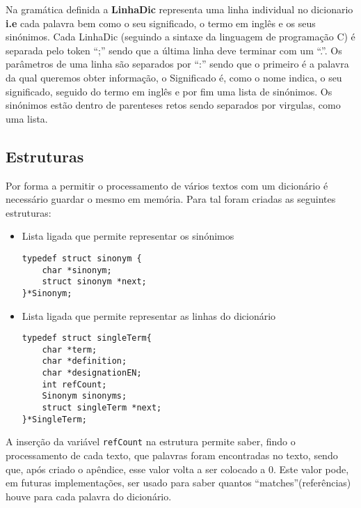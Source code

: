 \documentclass{llncs}
\begin{document}
Na gramática definida a \textbf{LinhaDic} representa uma linha individual no dicionario \textbf{i.e} cada palavra bem como o seu significado, o termo em inglês e os seus sinónimos. Cada LinhaDic (seguindo a sintaxe da linguagem de programação C) é separada pelo token ``;'' sendo que a última linha deve terminar com um ``.''. Os parâmetros de uma linha são separados por ``:'' sendo que o primeiro é a palavra da qual queremos obter informação, o Significado é, como o nome indica, o seu significado, seguido do termo em inglês e por fim uma lista de sinónimos. Os sinónimos estão dentro de parenteses retos sendo separados por virgulas, como uma lista.

\subsection{Estruturas}
Por forma a permitir o processamento de vários textos com um dicionário é necessário guardar o mesmo em memória. Para tal foram criadas as seguintes estruturas:
\renewcommand{\labelitemi}{$\bullet$}
\begin{itemize}
\item Lista ligada que permite representar os sinónimos
\begin{lstlisting}
typedef struct sinonym {
    char *sinonym;
    struct sinonym *next;
}*Sinonym;
\end{lstlisting}
\item Lista ligada que permite representar as linhas do dicionário
\begin{lstlisting}
typedef struct singleTerm{
    char *term;
    char *definition;
    char *designationEN;
    int refCount;
    Sinonym sinonyms;
    struct singleTerm *next;
}*SingleTerm;
\end{lstlisting}
\end{itemize}

A inserção da variável \texttt{refCount} na estrutura permite saber, findo o processamento de cada texto, que palavras foram encontradas no texto, sendo que, após criado o apêndice, esse valor volta a ser colocado a 0. Este valor pode, em futuras implementações, ser usado para saber quantos ``matches''(referências) houve para cada palavra do dicionário.
\end{document}
